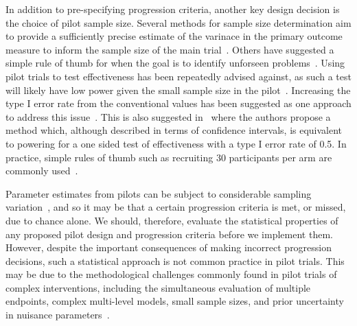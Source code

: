 \documentclass{article} %
\begin{document}
In addition to pre-specifying progression criteria, another key design decision is the choice of pilot sample size. Several methods for sample size determination aim to provide a sufficiently precise estimate of the varinace in the primary outcome measure to inform the sample size of the main trial~\cite{Browne1995, Julious2005, Sim2012, Teare2014, Eldridge2015, Whitehead2015}. Others have suggested a simple rule of thumb for when the goal is to identify unforseen problems~\cite{Viechtbauer2015}. Using pilot trials to test effectiveness has been repeatedly advised against, as such a test will likely have low power given the small sample size in the pilot~\cite{Lancaster2004, Arain2010, Thabane2010}. Increasing the type I error rate from the conventional values has been suggested as one approach to address this issue~\cite{Lee2014}. This is also suggested in~\cite{Cocks2013} where the authors propose a method which, although described in terms of confidence intervals, is equivalent to powering for a one sided test of effectiveness with a type I error rate of 0.5. In practice, simple rules of thumb such as recruiting 30 participants per arm are commonly used~\cite{Cocks2013, Whitehead2015}.




Parameter estimates from pilots can be subject to considerable sampling variation~\cite{Eldridge2015, Cooper2018}, and so it may be that a certain progression criteria is met, or missed, due to chance alone. We should, therefore, evaluate the statistical properties of any proposed pilot design and progression criteria before we implement them. However, despite the important consequences of making incorrect progression decisions, such a statistical approach is not common practice in pilot trials. This may be due to the methodological challenges commonly found in  pilot trials of complex interventions, including the simultaneous evaluation of multiple endpoints, complex multi-level models, small sample sizes, and prior uncertainty in nuisance parameters~\cite{Wilson2015}.
\end{document}
